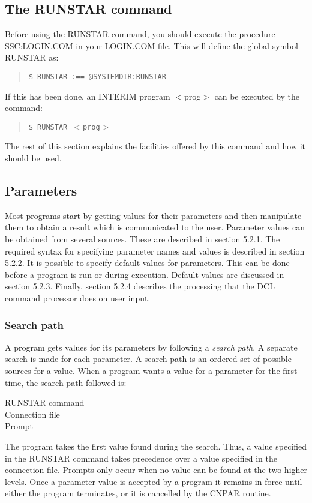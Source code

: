 \documentclass{article}
\begin{document}
\subsection {The RUNSTAR command}
Before using the RUNSTAR command, you should execute the procedure
SSC:LOGIN.COM in your LOGIN.COM file.
This will define the global symbol RUNSTAR as:
\begin{quote}
{\tt \$ RUNSTAR :== @SYSTEMDIR:RUNSTAR}
\end{quote}
If this has been done, an INTERIM program $<$prog$>$ can be executed by the command:
\begin{quote}
{\tt \$ RUNSTAR $<$prog$>$}
\end{quote}
The rest of this section explains the facilities offered by this command and how
it should be used.
\subsection {Parameters}
Most programs start by getting values for their parameters and then
manipulate them to obtain a result which is communicated to the user.
Parameter values can be obtained from several sources.
These are described in section 5.2.1.
The required syntax for specifying parameter names and values is described
in section 5.2.2.
It is possible to specify default values for parameters.
This can be done before a program is run or during execution.
Default values are discussed in section 5.2.3.
Finally, section 5.2.4 describes the processing that the DCL command processor
does on user input.
\subsubsection {Search path}
A program gets values for its parameters by following a {\em search path}.
A separate search is made for each parameter.
A search path is an ordered set of possible sources for a value.
When a program wants a value for a parameter for the first time, the search
path followed is:
\begin{description}
\item [RUNSTAR command]
\item [Connection file]
\item [Prompt]
\end{description}
The program takes the first value found during the search.
Thus, a value specified in the RUNSTAR command takes precedence over a value
specified in the connection file.
Prompts only occur when no value can be found at the two higher levels.
Once a parameter value is accepted by a program it remains in force until
either the program terminates, or it is cancelled by the CNPAR routine.
\end{document}
